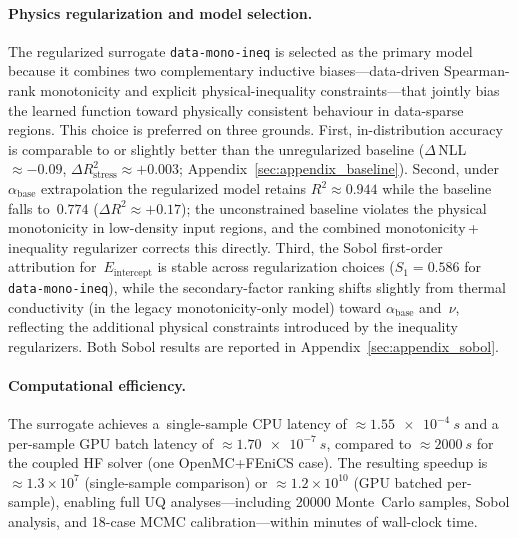 \documentclass[pdflatex,sn-mathphys-num]{sn-jnl}
\theoremstyle{thmstyleone}
\theoremstyle{thmstyletwo}
\theoremstyle{thmstylethree}
\begin{document}
\paragraph{Physics regularization and model selection.}
The regularized surrogate \texttt{data-mono-ineq} is selected as the primary
model because it combines two complementary inductive biases---data-driven
Spearman-rank monotonicity and explicit physical-inequality constraints---that
jointly bias the learned function toward physically consistent behaviour in
data-sparse regions.
This choice is preferred on three grounds.
First, in-distribution accuracy is comparable to or slightly better than the
unregularized baseline ($\Delta$\,NLL $\approx -0.09$,
$\Delta R^{2}_{\mathrm{stress}} \approx +0.003$;
Appendix~\ref{sec:appendix_baseline}).
Second, under $\alpha_{\mathrm{base}}$ extrapolation the regularized model
retains $R^2 \approx 0.944$ while the baseline falls to~$0.774$
($\Delta R^2 \approx +0.17$); the unconstrained baseline violates the
physical monotonicity in low-density input regions, and the combined
monotonicity\,+\,inequality regularizer corrects this directly.
Third, the Sobol first-order attribution for~$E_{\mathrm{intercept}}$ is
stable across regularization choices ($S_1 = 0.586$ for
\texttt{data-mono-ineq}), while the secondary-factor ranking shifts slightly
from thermal conductivity (in the legacy monotonicity-only model) toward
$\alpha_{\mathrm{base}}$ and~$\nu$, reflecting the additional physical
constraints introduced by the inequality regularizers.
Both Sobol results are reported in Appendix~\ref{sec:appendix_sobol}.

\paragraph{Computational efficiency.}
The surrogate achieves a~single-sample CPU latency of $\approx\SI{1.55e-4}{s}$ and a
per-sample GPU batch latency of $\approx\SI{1.70e-7}{s}$, compared to
$\approx\SI{2000}{s}$ for the coupled HF solver (one OpenMC+FEniCS case).
The resulting speedup is ${\approx}1.3\times10^7$ (single-sample comparison) or
${\approx}1.2\times10^{10}$ (GPU batched per-sample), enabling full UQ analyses---including
\num{20000} Monte~Carlo samples, Sobol analysis, and 18-case MCMC calibration---within
minutes of wall-clock time.

\end{document}
